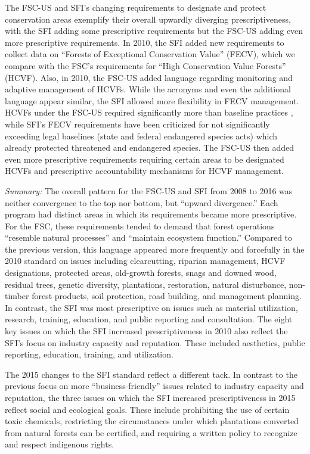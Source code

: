 \documentclass[
      12pt,
            Review ]{article}
\begin{document}
The FSC-US and SFI's changing requirements to designate and protect conservation areas exemplify their overall upwardly diverging prescriptiveness, with the SFI adding some prescriptive requirements but the FSC-US adding even more prescriptive requirements. In 2010, the SFI added new requirements to collect data on ``Forests of Exceptional Conservation Value'' (FECV), which we compare with the FSC's requirements for ``High Conservation Value Forests'' (HCVF). Also, in 2010, the FSC-US added language regarding monitoring and adaptive management of HCVFs. While the acronyms and even the additional language appear similar, the SFI allowed more flexibility in FECV management. HCVFs under the FSC-US required significantly more than baseline practices \citep{Newsom2005}, while SFI's FECV requirements have been criticized for not significantly exceeding legal baselines (state and federal endangered species acts) which already protected threatened and endangered species. The FSC-US then added even more prescriptive requirements requiring certain areas to be designated HCVFs and prescriptive accountability mechanisms for HCVF management.

\emph{Summary:} The overall pattern for the FSC-US and SFI from 2008 to 2016 was neither convergence to the top nor bottom, but ``upward divergence.'' Each program had distinct areas in which its requirements became more prescriptive. For the FSC, these requirements tended to demand that forest operations ``resemble natural processes'' and ``maintain ecosystem function.'' Compared to the previous version, this language appeared more frequently and forcefully in the 2010 standard on issues including clearcutting, riparian management, HCVF designations, protected areas, old-growth forests, snags and downed wood, residual trees, genetic diversity, plantations, restoration, natural disturbance, non-timber forest products, soil protection, road building, and management planning. In contrast, the SFI was most prescriptive on issues such as material utilization, research, training, education, and public reporting and consultation. The eight key issues on which the SFI increased prescriptiveness in 2010 also reflect the SFI's focus on industry capacity and reputation. These included aesthetics, public reporting, education, training, and utilization.

The 2015 changes to the SFI standard reflect a different tack. In contrast to the previous focus on more ``business-friendly'' issues related to industry capacity and reputation, the three issues on which the SFI increased prescriptiveness in 2015 reflect social and ecological goals. These include prohibiting the use of certain toxic chemicals, restricting the circumstances under which plantations converted from natural forests can be certified, and requiring a written policy to recognize and respect indigenous rights.
\end{document}

